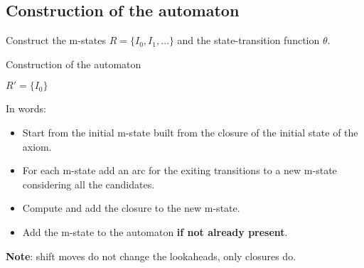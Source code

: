 \subsection{Construction of the automaton}
Construct the m-states $R = \{I_0, I_1, \ldots\}$ and the state-transition function $\theta$.

\begin{algorithm*}[H]
    \caption{Construction of the automaton}
    \SetAlgoLined
    $R' = \{I_0\}$\;
\end{algorithm*}

In words:
\begin{itemize}
    \item Start from the initial m-state built from the closure of the initial state of the axiom.
    \item For each m-state add an arc for the exiting transitions to a new m-state considering all the candidates.
    \item Compute and add the closure to the new m-state.
    \item Add the m-state to the automaton \textbf{if not already present}.
\end{itemize}

\textbf{Note}: shift moves do not change the lookaheads, only closures do.
